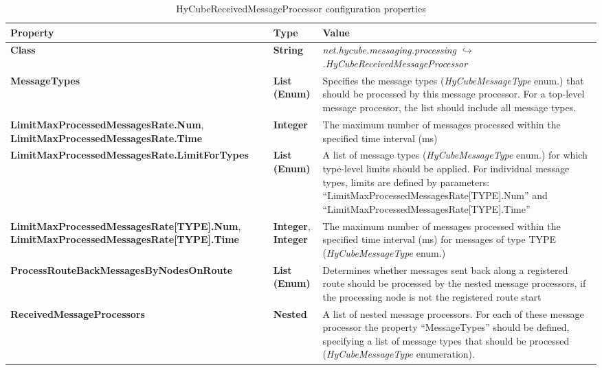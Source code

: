 \begin{table}
\scriptsize
\begin{center}
\begin{tabular}{p{6cm} p{1.5cm} p{7.0cm}}
	\hline
	\textbf{Property}										& \textbf{Type}					& \textbf{Value}					\\[1mm]
    \hline
	\textbf{Class}											& \textbf{String}				& \textit{net.hycube.messaging.processing \newline $\hookrightarrow$.HyCubeReceivedMessageProcessor}									\\[1.5mm]	
	\textbf{MessageTypes}									& \textbf{List (Enum)}			& Specifies the message types (\emph{HyCubeMessageType} enum.) that should be processed by this message processor. For a top-level message processor, the list should include all message types.					\\[1.5mm]	
	\textbf{LimitMaxProcessedMessagesRate.Num}, \textbf{LimitMaxProcessedMessagesRate.Time}				& \textbf{Integer}			& The maximum number of messages processed within the specified time interval (ms)		\\[1.5mm]	
	\textbf{LimitMaxProcessedMessagesRate.LimitForTypes}	& \textbf{List (Enum)}			& A list of message types (\emph{HyCubeMessageType} enum.) for which type-level limits should be applied. For individual message types, limits are defined by parameters: ``LimitMaxProcessedMessagesRate[TYPE].Num'' and ``LimitMaxProcessedMessagesRate[TYPE].Time''			\\[1.5mm]	
	\textbf{LimitMaxProcessedMessagesRate[TYPE].Num}, \textbf{LimitMaxProcessedMessagesRate[TYPE].Time}		& \textbf{Integer}, \textbf{Integer}			& The maximum number of messages processed within the specified time interval (ms) for messages of type TYPE (\emph{HyCubeMessageType} enum.)			\\[1.5mm]	
	\textbf{ProcessRouteBackMessagesByNodesOnRoute}			& \textbf{List (Enum)}			& Determines whether messages sent back along a registered route should be processed by the nested message processors, if the processing node is not the registered route start		\\[1.5mm]	
	\textbf{ReceivedMessageProcessors}						& \textbf{Nested}				& A list of nested message processors. For each of these message processor the property ``MessageTypes'' should be defined, specifying a list of message types that should be processed (\emph{HyCubeMessageType} enumeration).					\\[1.5mm]	
    \hline
\end{tabular}
\end{center}
\caption{HyCubeReceivedMessageProcessor configuration properties}
\label{tab:libHyCubeReceivedMessageProcessor}
\end{table}

